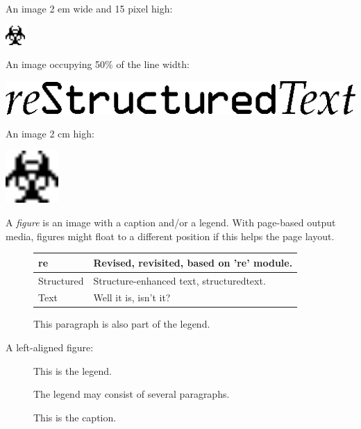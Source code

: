 \documentclass[a4paper]{article}
\newlength{\DUtablewidth} %
\newenvironment{DUlegend}{\small}{}
\begin{document}
An image 2 em wide and 15 pixel high:

\includegraphics[height=15\pdfpxdimen,width=2em]{../../../docs/user/rst/images/biohazard.png}

An image occupying 50\% of the line width:

\includegraphics[width=0.500\linewidth]{../../../docs/user/rst/images/title.png}

An image 2 cm high:

\includegraphics[height=2cm]{../../../docs/user/rst/images/biohazard.png}

A \emph{figure} is an image with a caption and/or a legend.  With page-based output
media, figures might float to a different position if this helps the page
layout.
\begin{figure}
\noindent{}
\caption{Plaintext markup syntax and parser system.}
\begin{DUlegend}
\leavevmode
\setlength{\DUtablewidth}{\linewidth}
\begin{longtable}[c]{|p{0.156\DUtablewidth}|p{0.563\DUtablewidth}|}
\hline

re
 & 
Revised, revisited, based on 're' module.
 \\
\hline

Structured
 & 
Structure-enhanced text, structuredtext.
 \\
\hline

Text
 & 
Well it is, isn't it?
 \\
\hline
\end{longtable}

This paragraph is also part of the legend.
\end{DUlegend}
\end{figure}

A left-aligned figure:
\begin{figure}
\noindent{}
\caption{This is the caption.}
\begin{DUlegend}
This is the legend.

The legend may consist of several paragraphs.
\end{DUlegend}
\end{figure}
\end{document}
